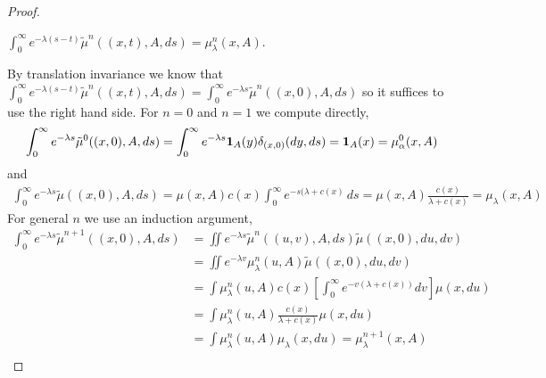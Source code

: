 \begin{proof}
\begin{clm}$\int_0^\infty e^{-\lambda (s-t)} \tilde{\mu}^n((x,t), A, ds) = \mu_\lambda^n(x, A)$.
\end{clm}
By translation invariance we know that $\int_0^\infty e^{-\lambda (s-t)} \tilde{\mu}^n((x,t), A, ds) = \int_0^\infty e^{-\lambda s} \tilde{\mu}^n((x,0), A, ds)$ so it suffices to use the
right hand side.  For $n=0$ and $n=1$ we compute directly,
\begin{align*}
\int_0^\infty e^{-\lambda s} \tilde{\mu}^0((x,0), A, ds) = \int_0^\infty e^{-\lambda s} \textbf{1}_{A}(y) \delta_{(x,0)} (dy, ds) = \textbf{1}_{A}(x) = \mu_\alpha^0(x,A)
\end{align*}
and
\begin{align*}
\int_0^\infty e^{-\lambda s} \tilde{\mu}((x,0), A, ds) = \mu(x,A) c(x) \int_0^\infty e^{-s (\lambda + c(x)} \, ds = \mu(x,A) \frac{c(x)}{\lambda + c(x)} = \mu_\lambda(x,A)
\end{align*}
For general $n$ we use an induction argument,
\begin{align*}
\int_0^\infty e^{-\lambda s} \tilde{\mu}^{n+1}((x,0), A, ds) 
&=\iint e^{-\lambda s} \tilde{\mu}^{n}((u,v), A, ds) \tilde{\mu}((x,0), du, dv) \\
&=\iint e^{-\lambda v} \mu_\lambda^n(u, A) \tilde{\mu}((x,0), du, dv) \\
&=\int \mu_\lambda^n(u, A) c(x) \left[ \int_0^\infty e^{-v(\lambda + c(x))} dv \right ] \mu(x, du)\\
&=\int \mu_\lambda^n(u, A) \frac{c(x)}{\lambda + c(x)} \mu(x, du)\\
&=\int \mu_\lambda^n(u, A) \mu_\lambda(x, du) = \mu_\lambda^{n+1}(x,A) \\
\end{align*}


\end{proof}
